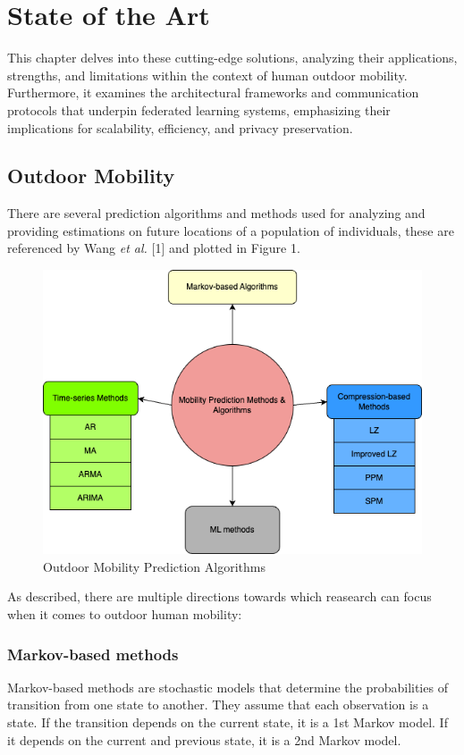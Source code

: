 \documentclass[conference]{IEEEtran}
\begin{document}
\section{State of the Art}

This chapter delves into these cutting-edge solutions, analyzing their applications, strengths, and limitations within the context of human outdoor mobility. Furthermore, it examines the architectural frameworks and communication protocols that underpin federated learning systems, emphasizing their implications for scalability, efficiency, and privacy preservation.

\subsection{Outdoor Mobility}

There are several prediction algorithms and methods used for analyzing and providing estimations on future locations of a population of individuals, these are referenced by Wang \textit{et al.} [1] and plotted in Figure 1.

\begin{figure}[htbp]
\centerline{\includegraphics[scale=0.4]{Outdoor_algorithms.png}}
\caption{Outdoor Mobility Prediction Algorithms}
\label{fig}
\end{figure}

As described, there are multiple directions towards which reasearch can focus when it comes to outdoor human mobility:

\subsubsection{Markov-based methods}
Markov-based methods are stochastic models that determine the probabilities of transition from one state to another. They assume that each observation is a state. If the transition depends on the current state, it is a 1st Markov model. If it depends on the current and previous state, it is a 2nd Markov model.
\end{document}
